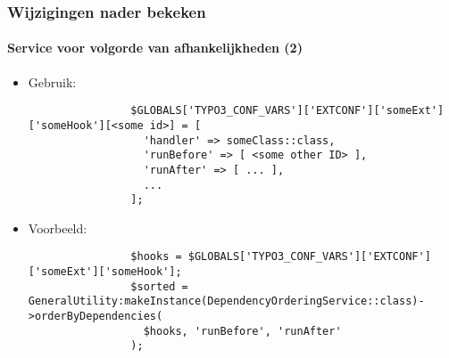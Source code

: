 \begin{frame}[fragile]
	\frametitle{Wijzigingen nader bekeken}
	\framesubtitle{Service voor volgorde van afhankelijkheden (2)}

	\lstset{basicstyle=\tiny\ttfamily}

	\begin{itemize}

		\item Gebruik:

			\begin{lstlisting}
				$GLOBALS['TYPO3_CONF_VARS']['EXTCONF']['someExt']['someHook'][<some id>] = [
				  'handler' => someClass::class,
				  'runBefore' => [ <some other ID> ],
				  'runAfter' => [ ... ],
				  ...
				];
			\end{lstlisting}

		\item Voorbeeld:

			\begin{lstlisting}
				$hooks = $GLOBALS['TYPO3_CONF_VARS']['EXTCONF']['someExt']['someHook'];
				$sorted = GeneralUtility:makeInstance(DependencyOrderingService::class)->orderByDependencies(
				  $hooks, 'runBefore', 'runAfter'
				);
			\end{lstlisting}

	\end{itemize}

\end{frame}


